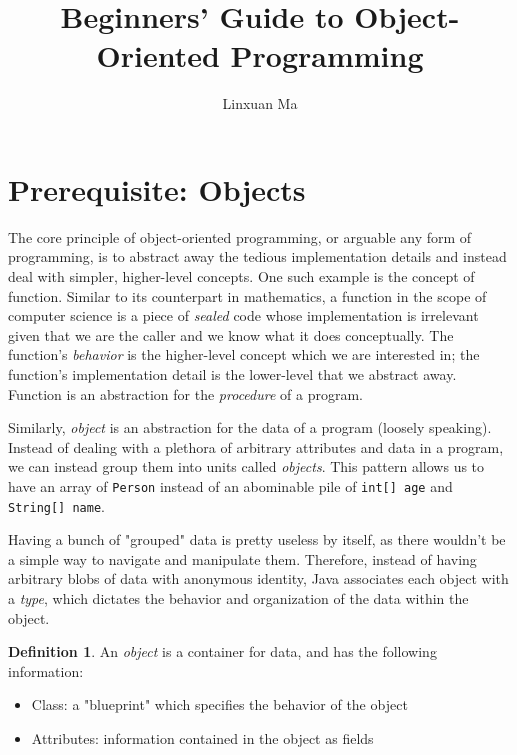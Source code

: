 \documentclass[12pt]{article}
\title{\vspace{-2.0cm}Beginners' Guide to Object-Oriented Programming}
\author{Linxuan Ma}
\theoremstyle{definition}
\newtheorem{defn}{Definition}[section]
\newcommand{\code}[1]{\colorbox{codegray}{\texttt{#1}}}
\begin{document}
	\maketitle
	
	
	\section{Prerequisite: Objects}
	
	The core principle of object-oriented programming, or arguable any form of programming, is to abstract away the tedious implementation details and instead deal with simpler, higher-level concepts. One such example is the concept of function. Similar to its counterpart in mathematics, a function in the scope of computer science is a piece of \emph{sealed} code whose implementation is irrelevant given that we are the caller and we know what it does conceptually. The function's \textit{behavior} is the higher-level concept which we are interested in; the function's implementation detail is the lower-level that we abstract away. Function is an abstraction for the \emph{procedure} of a program.
	
	Similarly, \emph{object} is an abstraction for the data of a program (loosely speaking). Instead of dealing with a plethora of arbitrary attributes and data in a program, we can instead group them into units called \emph{objects}. This pattern allows us to have an array of \code{Person} instead of an abominable pile of \code{int[] age} and \code{String[] name}.
	
	Having a bunch of "grouped" data is pretty useless by itself, as there wouldn't be a simple way to navigate and manipulate them. Therefore, instead of having arbitrary blobs of data with anonymous identity, Java associates each object with a \emph{type}, which dictates the behavior and organization of the data within the object.
	
	\begin{defn}
		An \emph{object} is a container for data, and has the following information:
		\begin{itemize}
			\item Class: a "blueprint" which specifies the behavior of the object
			\item Attributes: information contained in the object as fields
		\end{itemize}
	\end{defn}
	
\end{document}
